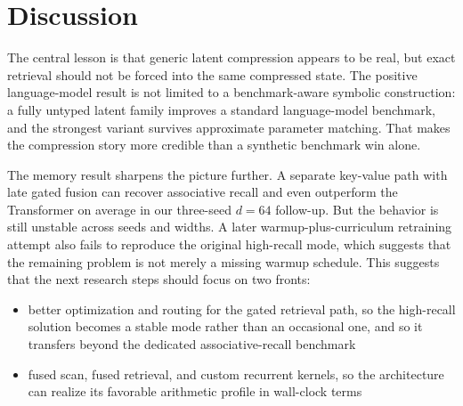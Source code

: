 \documentclass[11pt]{article}
\begin{document}
\section{Discussion}
The central lesson is that generic latent compression appears to be real, but
exact retrieval should not be forced into the same compressed state. The
positive language-model result is not limited to a benchmark-aware symbolic
construction: a fully untyped latent family improves a standard language-model
benchmark, and the strongest variant survives approximate parameter matching.
That makes the compression story more credible than a synthetic benchmark win
alone.

The memory result sharpens the picture further. A separate key-value path with
late gated fusion can recover associative recall and even outperform the
Transformer on average in our three-seed $d=64$ follow-up. But the behavior is
still unstable across seeds and widths. A later warmup-plus-curriculum
retraining attempt also fails to reproduce the original high-recall mode, which
suggests that the remaining problem is not merely a missing warmup schedule.
This suggests that the next research steps should focus on two fronts:
\begin{itemize}[leftmargin=1.25em]
  \item better optimization and routing for the gated retrieval path, so the
  high-recall solution becomes a stable mode rather than an occasional one,
  and so it transfers beyond the dedicated associative-recall benchmark
  \item fused scan, fused retrieval, and custom recurrent kernels, so the
  architecture can realize its favorable arithmetic profile in wall-clock terms
\end{itemize}
\end{document}
